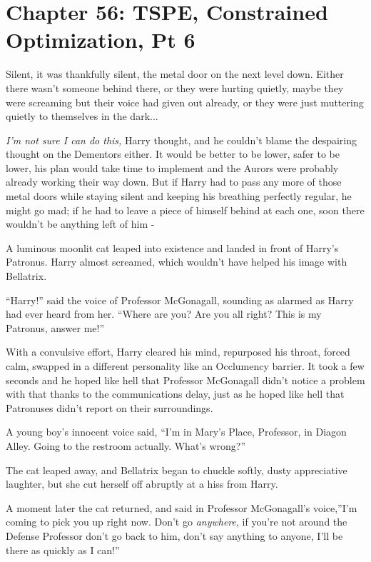 \chapter{Chapter 56: TSPE, Constrained Optimization, Pt 6}
Silent, it was thankfully silent, the metal door on the next level down.
Either there wasn't someone behind there, or they were hurting quietly,
maybe they were screaming but their voice had given out already, or they
were just muttering quietly to themselves in the dark...

\emph{I'm not sure I can do this,} Harry thought, and he couldn't blame
the despairing thought on the Dementors either. It would be better to be
lower, safer to be lower, his plan would take time to implement and the
Aurors were probably already working their way down. But if Harry had to
pass any more of those metal doors while staying silent and keeping his
breathing perfectly regular, he might go mad; if he had to leave a piece
of himself behind at each one, soon there wouldn't be anything left of
him -

A luminous moonlit cat leaped into existence and landed in front of
Harry's Patronus. Harry almost screamed, which wouldn't have helped his
image with Bellatrix.

``Harry!'' said the voice of Professor McGonagall, sounding as alarmed
as Harry had ever heard from her. ``Where are you? Are you all right?
This is my Patronus, answer me!''

With a convulsive effort, Harry cleared his mind, repurposed his throat,
forced calm, swapped in a different personality like an Occlumency
barrier. It took a few seconds and he hoped like hell that Professor
McGonagall didn't notice a problem with that thanks to the
communications delay, just as he hoped like hell that Patronuses didn't
report on their surroundings.

A young boy's innocent voice said, ``I'm in Mary's Place, Professor, in
Diagon Alley. Going to the restroom actually. What's wrong?''

The cat leaped away, and Bellatrix began to chuckle softly, dusty
appreciative laughter, but she cut herself off abruptly at a hiss from
Harry.

A moment later the cat returned, and said in Professor McGonagall's
voice,''I'm coming to pick you up right now. Don't go \emph{anywhere},
if you're not around the Defense Professor don't go back to him, don't
say anything to anyone, I'll be there as quickly as I can!''

